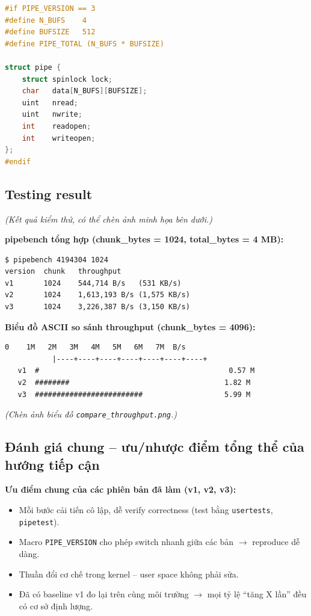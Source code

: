 \documentclass[11pt,a4paper]{article}
\begin{document}
\begin{lstlisting}[language=C]
#if PIPE_VERSION == 3
#define N_BUFS    4
#define BUFSIZE   512
#define PIPE_TOTAL (N_BUFS * BUFSIZE)

struct pipe {
    struct spinlock lock;
    char   data[N_BUFS][BUFSIZE];
    uint   nread;
    uint   nwrite;
    int    readopen;
    int    writeopen;
};
#endif
\end{lstlisting}

\subsection{Testing result}

\textit{(Kết quả kiểm thử, có thể chèn ảnh minh họa bên dưới.)}

\textbf{pipebench tổng hợp (chunk\_bytes = 1024, total\_bytes = 4 MB):}

\begin{lstlisting}[style=plain]
$ pipebench 4194304 1024
version  chunk   throughput
v1       1024    544,714 B/s   (531 KB/s)
v2       1024    1,613,193 B/s (1,575 KB/s)
v3       1024    3,226,387 B/s (3,150 KB/s)
\end{lstlisting}

\textbf{Biểu đồ ASCII so sánh throughput (chunk\_bytes = 4096):}

\begin{lstlisting}[style=plain]
           0    1M   2M   3M   4M   5M   6M   7M  B/s
           |----+----+----+----+----+----+----+
   v1  #                                            0.57 M
   v2  ########                                    1.82 M
   v3  #########################                   5.99 M
\end{lstlisting}

\textit{(Chèn ảnh biểu đồ \texttt{compare\_throughput.png}.)}

\subsection{Đánh giá chung -- ưu/nhược điểm tổng thể của hướng tiếp cận}

\textbf{Ưu điểm chung của các phiên bản đã làm (v1, v2, v3):}
\begin{itemize}
  \item Mỗi bước cải tiến cô lập, dễ verify correctness (test bằng \texttt{usertests}, \texttt{pipetest}).
  \item Macro \texttt{PIPE\_VERSION} cho phép switch nhanh giữa các bản $\rightarrow$ reproduce dễ dàng.
  \item Thuần đổi cơ chế trong kernel -- user space không phải sửa.
  \item Đã có baseline v1 đo lại trên cùng môi trường $\rightarrow$ mọi tỷ lệ ``tăng X lần'' đều có cơ sở định lượng.
\end{itemize}
\end{document}
